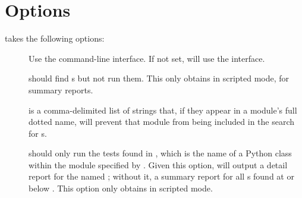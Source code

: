 \chapter{Options \label{options}}

 takes the following options:

\begin{description}

\item[]
\item[]
    {Use the command-line interface. If not set,  will use
    the  interface.}

\item[]
\item[]
    { should find s but not run them. This
    only obtains in scripted mode, for summary reports.}

\item[ ]
\item[ ]
    { is a comma-delimited list of strings that, if they appear
    in a module's full dotted name, will prevent that module from being included
    in the search for s.}

\item[ ]
\item[ ]
\item[ ]
    { should only run the tests found in  ,
    which is the name of a Python  class within the
    module specified by . Given this option, 
    will output a detail report for the named ; without it, a
    summary report for all s found at or below .
    This option only obtains in scripted mode.}

\end{description}
